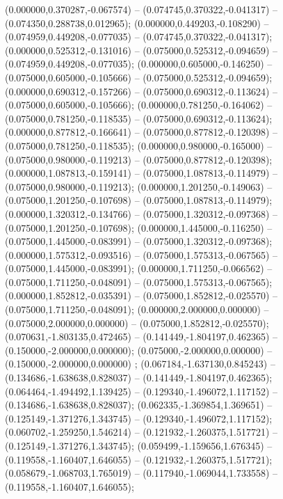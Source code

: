  (0.000000,0.370287,-0.067574) -- (0.074745,0.370322,-0.041317) -- (0.074350,0.288738,0.012965);
 (0.000000,0.449203,-0.108290) -- (0.074959,0.449208,-0.077035) -- (0.074745,0.370322,-0.041317);
 (0.000000,0.525312,-0.131016) -- (0.075000,0.525312,-0.094659) -- (0.074959,0.449208,-0.077035);
 (0.000000,0.605000,-0.146250) -- (0.075000,0.605000,-0.105666) -- (0.075000,0.525312,-0.094659);
 (0.000000,0.690312,-0.157266) -- (0.075000,0.690312,-0.113624) -- (0.075000,0.605000,-0.105666);
 (0.000000,0.781250,-0.164062) -- (0.075000,0.781250,-0.118535) -- (0.075000,0.690312,-0.113624);
 (0.000000,0.877812,-0.166641) -- (0.075000,0.877812,-0.120398) -- (0.075000,0.781250,-0.118535);
 (0.000000,0.980000,-0.165000) -- (0.075000,0.980000,-0.119213) -- (0.075000,0.877812,-0.120398);
 (0.000000,1.087813,-0.159141) -- (0.075000,1.087813,-0.114979) -- (0.075000,0.980000,-0.119213);
 (0.000000,1.201250,-0.149063) -- (0.075000,1.201250,-0.107698) -- (0.075000,1.087813,-0.114979);
 (0.000000,1.320312,-0.134766) -- (0.075000,1.320312,-0.097368) -- (0.075000,1.201250,-0.107698);
 (0.000000,1.445000,-0.116250) -- (0.075000,1.445000,-0.083991) -- (0.075000,1.320312,-0.097368);
 (0.000000,1.575312,-0.093516) -- (0.075000,1.575313,-0.067565) -- (0.075000,1.445000,-0.083991);
 (0.000000,1.711250,-0.066562) -- (0.075000,1.711250,-0.048091) -- (0.075000,1.575313,-0.067565);
 (0.000000,1.852812,-0.035391) -- (0.075000,1.852812,-0.025570) -- (0.075000,1.711250,-0.048091);
 (0.000000,2.000000,0.000000) -- (0.075000,2.000000,0.000000) -- (0.075000,1.852812,-0.025570);
 (0.070631,-1.803135,0.472465) -- (0.141449,-1.804197,0.462365) -- (0.150000,-2.000000,0.000000);
 (0.075000,-2.000000,0.000000) -- (0.150000,-2.000000,0.000000) ;
 (0.067184,-1.637130,0.845243) -- (0.134686,-1.638638,0.828037) -- (0.141449,-1.804197,0.462365);
 (0.064464,-1.494492,1.139425) -- (0.129340,-1.496072,1.117152) -- (0.134686,-1.638638,0.828037);
 (0.062335,-1.369854,1.369651) -- (0.125149,-1.371276,1.343745) -- (0.129340,-1.496072,1.117152);
 (0.060702,-1.259250,1.546214) -- (0.121932,-1.260375,1.517721) -- (0.125149,-1.371276,1.343745);
 (0.059499,-1.159656,1.676345) -- (0.119558,-1.160407,1.646055) -- (0.121932,-1.260375,1.517721);
 (0.058679,-1.068703,1.765019) -- (0.117940,-1.069044,1.733558) -- (0.119558,-1.160407,1.646055);

